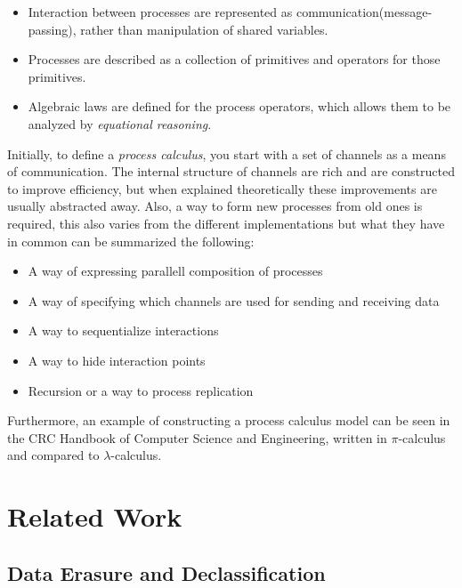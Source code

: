 \begin{itemize}
\item Interaction between processes are represented as communication(message-passing), rather than manipulation of shared variables. %
\item Processes are described as a collection of primitives and operators for those primitives. %
\item Algebraic laws are defined for the process operators, which allows them to be analyzed by \textit{equational reasoning}.%
\end{itemize}

Initially, to define a \textit{process calculus}, you start with a set of channels as a means of communication. The internal structure of channels are rich and are constructed to improve efficiency, but when explained theoretically these improvements are usually abstracted away. Also, a way to form new processes from old ones is required, this also varies from the different implementations but what they have in common can be summarized the following: %

\begin{itemize}
\item A way of expressing parallell composition of processes
\item A way of specifying which channels are used for sending and receiving data
\item A way to sequentialize interactions
\item A way to hide interaction points
\item Recursion or a way to process replication
\end{itemize}

Furthermore, an example of constructing a process calculus model can be seen in the CRC Handbook of Computer Science and Engineering\cite{pierce1997foundational}, written in $\pi$-calculus and compared to $\lambda$-calculus. %

\section{Related Work}

\subsection{Data Erasure and Declassification}


